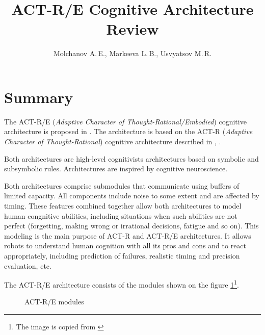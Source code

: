 \documentclass[10pt]{article}
\title{ACT-R/E Cognitive Architecture Review}
\author{Molchanov A.\,E., Markeeva L.\,B., Usvyatsov M.\,R.}
\begin{document}
\maketitle
\section{Summary}

The ACT-R/E (\emph{Adaptive Character of Thought-Rational/Embodied}) cognitive architecture is proposed in \cite{actre}. The architecture is based on the ACT-R (\emph{Adaptive Character of Thought-Rational}) cognitive architecture described in \cite{actr1}, \cite{actr2}. 

Both architectures are high-level cognitivists architectures based on symbolic and subsymbolic rules. Architectures are inspired by cognitive neuroscience. 

Both architectures comprise submodules that communicate using buffers of limited capacity. All components include noise to some extent and are affected by timing. These features combined together allow both architectures to model human congnitive abilities, including situations when such abilities are not perfect (forgetting, making wrong or irrational decisions, fatigue and so on). This modeling is the main purpose of ACT-R and ACT-R/E architectures. It allows robots to understand human cognition with all its pros and cons and to react appropriately, including prediction of failures, realistic timing and precision evaluation, etc.

The ACT-R/E architecture consists of the modules shown on the figure \ref{fig:modules}\footnote{The image is copied from \cite{actre}}. 

\noindent


\begin{figure}[h!]
	\caption{ACT-R/E modules }
	\label{fig:modules}
\end{figure}
\end{document}
